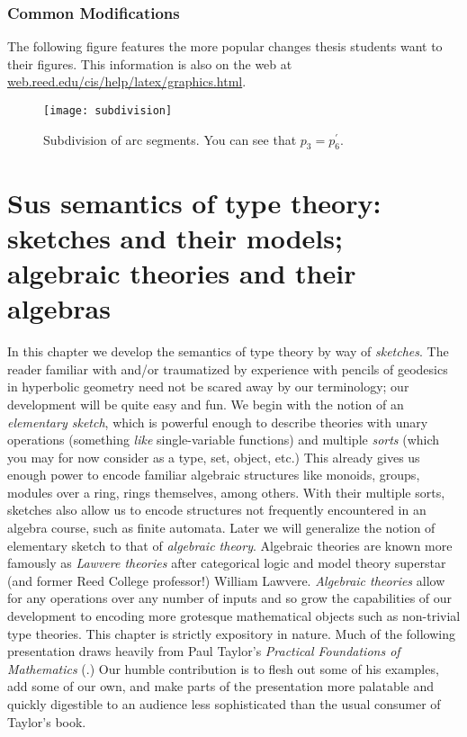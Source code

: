 \documentclass[12pt,twoside]{reedthesis}
\begin{document}
\subsection{Common Modifications}
The following figure features the more popular changes thesis students want to their figures. This information is also on the web at \url{web.reed.edu/cis/help/latex/graphics.html}.
\begin{figure}[htbp]
  \begin{center}
    \texttt{[image: subdivision]}
    \caption[Subdivision of arc segments]{\footnotesize{Subdivision of arc segments. You can see that $ p_3 = p_6^\prime$.}} %
    \label{barplot}
  \end{center}
\end{figure}

\chapter{Sus semantics of type theory: sketches and their models; algebraic theories and their algebras}
In this chapter we develop the semantics of type theory by way of
\emph{sketches}. The reader familiar with and/or traumatized by experience with
pencils of geodesics in hyperbolic geometry need not be scared away by our
terminology; our development will be quite easy and fun. We begin with the
notion of an \emph{elementary sketch}, which is powerful enough to describe
theories with unary operations (something \emph{like} single-variable functions)
and multiple \emph{sorts} (which you may for now consider as a type, set,
object, etc.) This already gives us enough power to encode familiar algebraic
structures like monoids, groups, modules over a ring, rings themselves, among
others. With their multiple sorts, sketches also allow us to encode structures
not frequently encountered in an algebra course, such as finite automata. Later
we will generalize the notion of elementary sketch to that of \emph{algebraic
  theory}. Algebraic theories are known more famously as \emph{Lawvere theories}
after categorical logic and model theory superstar (and former Reed College
professor!) William Lawvere. \emph{Algebraic theories} allow for any operations
over any number of inputs and so grow the capabilities of our development to
encoding more grotesque mathematical objects such as non-trivial type theories.
This chapter is strictly expository in nature. Much of the following
presentation draws heavily from Paul Taylor's \emph{Practical Foundations of
  Mathematics} (\cite{taylor_practical_1999}.) Our humble contribution is to
flesh out some of his examples, add some of our own, and make parts of the
presentation more palatable and quickly digestible to an audience less
sophisticated than the usual consumer of Taylor's book.
\end{document}
